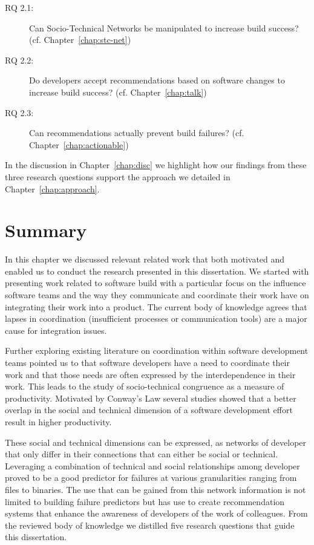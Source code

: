 \begin{description}
  \item[RQ 2.1:] Can Socio-Technical Networks be manipulated to increase build success? (cf. Chapter~\ref{chap:stc-net})
  \item[RQ 2.2:] Do developers accept recommendations based on software changes to increase build success? (cf. Chapter~\ref{chap:talk})
  \item[RQ 2.3:] Can recommendations actually prevent build failures? (cf. Chapter~\ref{chap:actionable})
\end{description}

In the discussion in Chapter~\ref{chap:disc} we highlight how our findings from these three research questions support the approach we detailed in Chapter~\ref{chap:approach}.


\section{Summary}
In this chapter we discussed relevant related work that both motivated and enabled us to conduct the research presented in this dissertation.
We started with presenting work related to software build with a particular focus on the influence software teams and the way they communicate and coordinate their work have on integrating their work into a product.
The current body of knowledge agrees that lapses in coordination (insufficient processes or communication tools) are a major cause for integration issues.

Further exploring existing literature on coordination within software development teams pointed us to that software developers have a need to coordinate their work and that those needs are often expressed by the interdependence in their work.
This leads to the study of socio-technical congruence as a measure of productivity. 
Motivated by Conway's Law several studies showed that a better overlap in the social and technical dimension of a software development effort result in higher productivity.

These social and technical dimensions can be expressed, as networks of developer that only differ in their connections that can either be social or technical.
Leveraging a combination of technical and social relationships among developer proved to be a good predictor for failures at various granularities ranging from files to binaries. 
The use that can be gained from this network information is not limited to building failure predictors but has use to create recommendation systems that enhance the awareness of developers of the work of colleagues.
From the reviewed body of knowledge we distilled five research questions that guide this dissertation.





